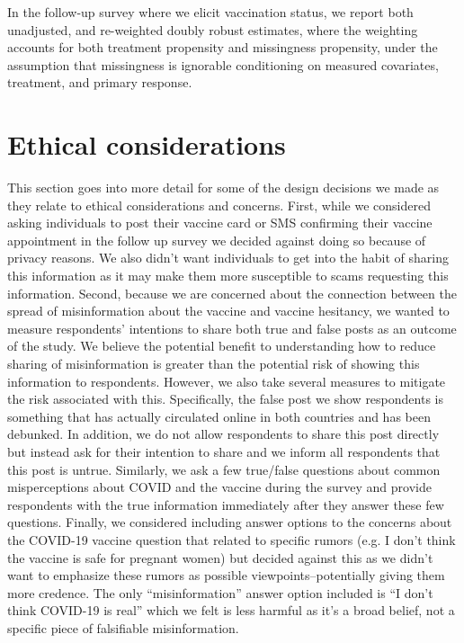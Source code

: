 \documentclass[letterpaper, 12pt, parskip=full,DIV=10]{scrartcl}
\begin{document}
In the follow-up survey where we elicit vaccination status, we report both unadjusted, and re-weighted doubly robust estimates, where the weighting accounts for both treatment propensity and missingness propensity, under the assumption that missingness is ignorable conditioning on measured covariates, treatment, and primary response.  

\section{Ethical considerations}

This section goes into more detail for some of the design decisions we made as they relate to ethical considerations and concerns. First, while we considered asking individuals to post their vaccine card or SMS confirming their vaccine appointment in the follow up survey we decided against doing so because of privacy reasons. We also didn't want individuals to get into the habit of sharing this information as it may make them more susceptible to scams requesting this information. Second, because we are concerned about the connection between the spread of misinformation about the vaccine and vaccine hesitancy, we wanted to measure respondents' intentions to share both true and false posts as an outcome of the study. We believe the potential benefit to understanding how to reduce sharing of misinformation is greater than the potential risk of showing this information to respondents. However, we also take several measures to mitigate the risk associated with this. Specifically, the false post we show respondents is something that has actually circulated online in both countries and has been debunked. In addition, we do not allow respondents to share this post directly but instead ask for their intention to share and we inform all respondents that this post is untrue. Similarly, we ask a few true/false questions about common misperceptions about COVID and the vaccine during the survey and provide respondents with the true information immediately after they answer these few questions. Finally, we considered including answer options to the concerns about the COVID-19 vaccine question that related to specific rumors (e.g. I don't think the vaccine is safe for pregnant women) but decided against this as we didn't want to emphasize these rumors as possible viewpoints--potentially giving them more credence. The only ``misinformation'' answer option included is ``I don't think COVID-19 is real'' which we felt is less harmful as it's a broad belief, not a specific piece of falsifiable misinformation. 

\clearpage


\clearpage
\appendix
\end{document}
